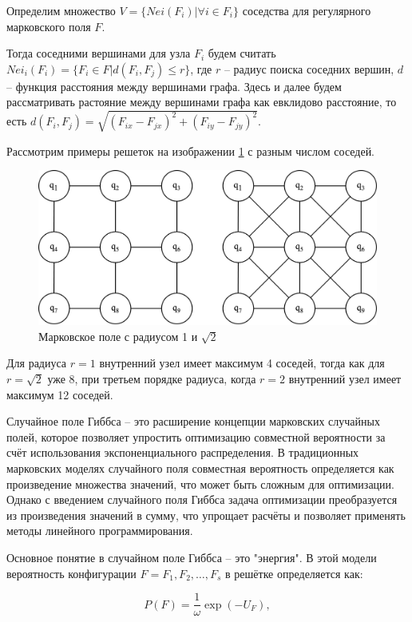 Определим множество $V = \{ Nei(F_i) | \forall i \in F_i \}$ соседства для регулярного марковского поля $F$.

Тогда соседними вершинами для узла $F_i$ будем считать $Nei_i (F_i) = \{ F_i \in F | d(F_i, F_j) \leq r \}$, где $r$ -- радиус поиска соседних вершин, $d$ -- функция расстояния между вершинами графа. Здесь и далее будем рассматривать растояние между вершинами графа как евклидово расстояние, то есть $d(F_i, F_j) = \sqrt{(F_{ix} - F_{jx})^2 + (F_{iy} - F_{jy})^2}$.

Рассмотрим примеры решеток на изображении \ref{fig:markov_field_nei_ex} с разным числом соседей.

\begin{figure}[H]
	\begin{center}
		\includegraphics[width=0.7\linewidth]{src/img/1/markov_field_nei_ex.png}
		\caption{Марковское поле с радиусом 1 и $\sqrt{2}$}
		\label{fig:markov_field_nei_ex}
	\end{center}
\end{figure}

Для радиуса $r = 1$ внутренний узел имеет максимум 4 соседей, тогда как для $r = \sqrt{2}$ уже 8, при третьем порядке радиуса, когда $r = 2$ внутренний узел имеет максимум 12 соседей.


Случайное поле Гиббса -- это расширение концепции марковских случайных полей, которое позволяет упростить оптимизацию совместной вероятности за счёт использования экспоненциального распределения. В традиционных марковских моделях случайного поля совместная вероятность определяется как произведение множества значений, что может быть сложным для оптимизации. Однако с введением случайного поля Гиббса задача оптимизации преобразуется из произведения значений в сумму, что упрощает расчёты и позволяет применять методы линейного программирования.

Основное понятие в случайном поле Гиббса -- это "энергия". В этой модели вероятность конфигурации $F = {F_1, F_2, \ldots, F_s}$ в решётке определяется как:

$$P(F) = \dfrac{1}{\omega} \exp(-U_F),$$

